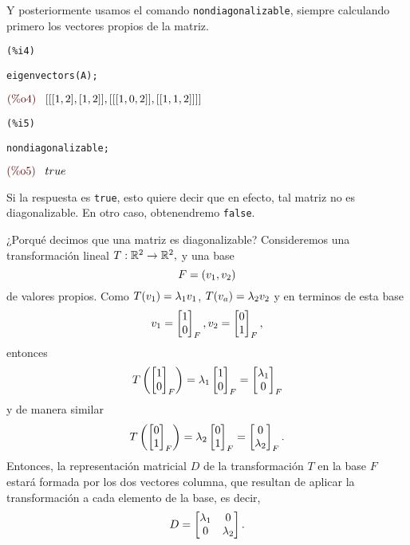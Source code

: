 \begin{solucion}
Y posteriormente usamos el comando \texttt{nondiagonalizable}, siempre calculando primero los vectores propios de la
matriz.


\noindent
\begin{minipage}{8ex}{\color{red}\bf
\begin{verbatim}
(%i4)
\end{verbatim}}
\end{minipage}
\begin{minipage}{\textwidth}{\color{blue}
\begin{verbatim}
eigenvectors(A);
\end{verbatim}}
\end{minipage}
\begin{math}\displaystyle
\parbox{8ex}{\color{labelcolor}(\%o4) }
[[[1,2],[1,2]],[[[1,0,2]],[[1,1,2]]]]
\end{math}

\noindent
\begin{minipage}{8ex}{\color{red}\bf
\begin{verbatim}
(%i5)
\end{verbatim}}
\end{minipage}
\begin{minipage}{\textwidth}{\color{blue}
\begin{verbatim}
nondiagonalizable;
\end{verbatim}}
\end{minipage}
\begin{math}\displaystyle
\parbox{8ex}{\color{labelcolor}(\%o5) }
true
\end{math}

Si la respuesta es \texttt{true}, esto quiere decir que en efecto, tal matriz no es diagonalizable. En otro caso,
obtenendremo \texttt{false}.
\end{solucion}

¿Porqué decimos que una matriz es diagonalizable? Consideremos una transformación lineal $T:\mathbb{R}^{2}\to
\mathbb{R}^{2},$ y una base $$
F=\left( v_{1}, v_{2} \right)
$$
de valores propios. Como $T(v_{1})=\lambda_{1} v_{1}$, $T(v_{a})=\lambda_{2} v_{2}$ y en terminos de esta base
$$
v_{1}=\begin{bmatrix}1\\0\end{bmatrix}_{F}, v_{2}=\begin{bmatrix}0\\1\end{bmatrix}_{F},
$$
entonces
$$
T\left( \begin{bmatrix}1\\0\end{bmatrix}_{F} \right)=\lambda_{1}\begin{bmatrix}1\\0\end{bmatrix}_{F}=\begin{bmatrix}\lambda_{1}\\0\end{bmatrix}_{F}
$$
y de manera similar
$$
T\left( \begin{bmatrix}0\\1\end{bmatrix}_{F} \right)=\lambda_{2}\begin{bmatrix}0\\1\end{bmatrix}_{F}=\begin{bmatrix}0\\\lambda_{2}\end{bmatrix}_{F}.
$$
Entonces, la representación matricial $D$ de la transformación $T$ en la base $F$ estará formada por los dos vectores
columna, que resultan de aplicar la transformación a cada elemento de la base, es decir,
$$
D=\begin{bmatrix}\lambda_{1} & 0 \\ 0 & \lambda_{2}\end{bmatrix}.
$$

